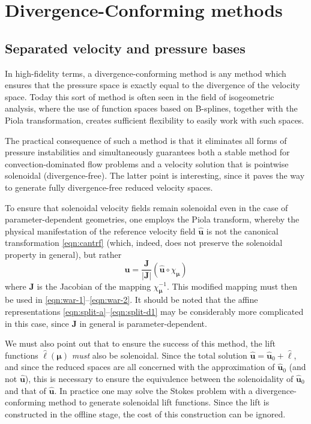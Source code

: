 \documentclass[onecolumn, twoside, a4paper, 11pt]{article}
\begin{document}
\section{Divergence-Conforming methods}
\label{sec:divconf}

\subsection{Separated velocity and pressure bases}
\label{sec:conforming}

In high-fidelity terms, a divergence-conforming method is any method which
ensures that the pressure space is exactly equal to the divergence of the
velocity space. Today this sort of method is often seen in the field of
isogeometric analysis, where the use of function spaces based on B-splines,
together with the Piola transformation, creates sufficient flexibility to easily
work with such spaces.

The practical consequence of such a method is that it eliminates all forms of
pressure instabilities and simultaneously guarantees both a stable method for
convection-dominated flow problems and a velocity solution that is pointwise
solenoidal (divergence-free). The latter point is interesting, since it paves
the way to generate fully divergence-free reduced velocity spaces.

To ensure that solenoidal velocity fields remain solenoidal even in the case of
parameter-dependent geometries, one employs the Piola transform, whereby the
physical manifestation of the reference velocity field $\hat{\bm u}$ is not the
canonical transformation \eqref{eqn:cantrf} (which, indeed, does not
preserve the solenoidal property in general), but rather
\begin{equation}
  \label{eqn:piola}
  \bm u = \frac{\bm J}{|\bm J|} (\hat{\bm u} \circ \chi_{\bm\mu})
\end{equation}
where $\bm J$ is the Jacobian of the mapping $\chi_{\bm \mu}^{-1}$. This modified
mapping must then be used in \eqref{eqn:war-1}--\eqref{eqn:war-2}. It should be
noted that the affine representations \eqref{eqn:split-a}--\eqref{eqn:split-d1}
may be considerably more complicated in this case, since $\bm J$ in general is
parameter-dependent.

We must also point out that to ensure the success of this method, the lift
functions $\hat{\bm \ell}(\bm \mu)$ \emph{must} also be solenoidal. Since the total
solution $\hat{\bm u} = \hat{\bm u}_0 + \hat{\bm \ell}$, and since the reduced spaces are all
concerned with the approximation of $\hat{\bm u}_0$ (and not $\hat{\bm u}$), this is
necessary to ensure the equivalence between the solenoidality of $\hat{\bm u}_0$ and
that of $\hat{\bm u}$. In practice one may solve the Stokes problem with a
divergence-conforming method to generate solenoidal lift functions. Since the lift is constructed in
the offline stage, the cost of this construction can be ignored.
\end{document}
